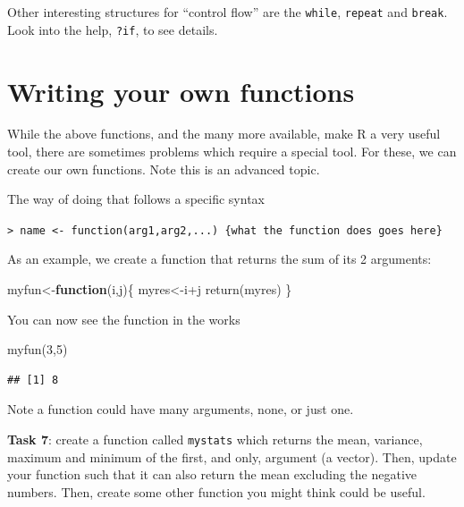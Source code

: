 \documentclass[
]{article}
\newenvironment{Shaded}{\begin{snugshade}}{\end{snugshade}}
\newcommand{\ControlFlowTok}[1]{\textcolor[rgb]{0.13,0.29,0.53}{\textbf{#1}}}
\newcommand{\DecValTok}[1]{\textcolor[rgb]{0.00,0.00,0.81}{#1}}
\newcommand{\FunctionTok}[1]{\textcolor[rgb]{0.00,0.00,0.00}{#1}}
\newcommand{\NormalTok}[1]{#1}
\newcommand{\OtherTok}[1]{\textcolor[rgb]{0.56,0.35,0.01}{#1}}
\newcommand{\SpecialCharTok}[1]{\textcolor[rgb]{0.00,0.00,0.00}{#1}}
\begin{document}
Other interesting structures for ``control flow'' are the
\texttt{while}, \texttt{repeat} and \texttt{break}. Look into the help,
\texttt{?if}, to see details.

\hypertarget{writing-your-own-functions}{%
\section{Writing your own functions}\label{writing-your-own-functions}}

While the above functions, and the many more available, make R a very
useful tool, there are sometimes problems which require a special tool.
For these, we can create our own functions. Note this is an advanced
topic.

The way of doing that follows a specific syntax

\texttt{\textgreater{}\ name\ \textless{}-\ function(arg1,arg2,...)\ \{what\ the\ function\ does\ goes\ here\}}

As an example, we create a function that returns the sum of its 2
arguments:

\begin{Shaded}
\begin{Highlighting}[]
\NormalTok{myfun}\OtherTok{\textless{}{-}}\ControlFlowTok{function}\NormalTok{(i,j)\{}
\NormalTok{  myres}\OtherTok{\textless{}{-}}\NormalTok{i}\SpecialCharTok{+}\NormalTok{j}
  \FunctionTok{return}\NormalTok{(myres)}
\NormalTok{\}}
\end{Highlighting}
\end{Shaded}

You can now see the function in the works

\begin{Shaded}
\begin{Highlighting}[]
\FunctionTok{myfun}\NormalTok{(}\DecValTok{3}\NormalTok{,}\DecValTok{5}\NormalTok{)}
\end{Highlighting}
\end{Shaded}

\begin{verbatim}
## [1] 8
\end{verbatim}

Note a function could have many arguments, none, or just one.

\textbf{Task 7}: create a function called \texttt{mystats} which returns
the mean, variance, maximum and minimum of the first, and only, argument
(a vector). Then, update your function such that it can also return the
mean excluding the negative numbers. Then, create some other function
you might think could be useful.
\end{document}
